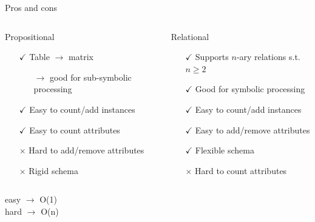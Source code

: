 \documentclass[presentation]{beamer}\mode<presentation>{\usetheme{AMSBolognaFC}}
\begin{document}
\begin{frame}{Pros and cons}
    \begin{columns}
        \begin{column}{.48\linewidth}
            \begin{block}{Propositional}
                \begin{itemize}
                    \item[$\checkmark$] Table $\rightarrow$ matrix
                    \begin{itemize}
                        \item[$\rightarrow$] good for sub-symbolic processing
                    \end{itemize}
                    \item[$\checkmark$] Easy to count/add instances
                    \item[$\checkmark$] Easy to count attributes
                    \item[$\times$] Hard to add/remove attributes
                    \item[$\times$] Rigid schema
                \end{itemize}
            \end{block}
        \end{column}
        \begin{column}{.48\linewidth}
            \begin{block}{Relational}
                \begin{itemize}
                    \item[$\checkmark$] Supports $n$-ary relations s.t. $n\geq2$
                    \item[$\checkmark$] Good for symbolic processing
                    \item[$\checkmark$] Easy to count/add instances
                    \item[$\checkmark$] Easy to add/remove attributes
                    \item[$\checkmark$] Flexible schema
                    \item[$\times$] Hard to count attributes
                \end{itemize}
            \end{block}
        \end{column}
    \end{columns}
    \begin{center}
        \alert{easy} $\rightarrow$ O(1)
        \\
        \alert{hard} $\rightarrow$ O(n)
    \end{center}
\end{frame}
\end{document}

